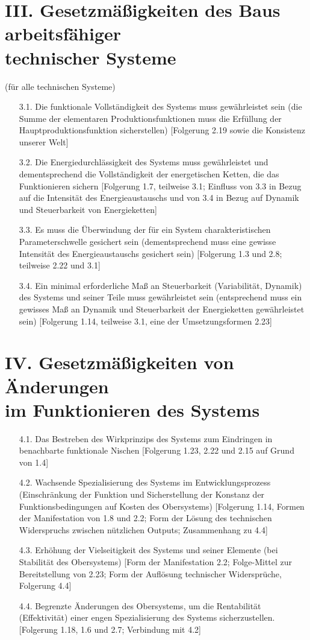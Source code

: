 \documentclass[11pt,a4paper]{article}
\begin{document}
\section*{III. Gesetzmäßigkeiten des Baus arbeitsfähiger\\ technischer
  Systeme}  
(für alle technischen Systeme)
\begin{itemize}
\item[3.1.] Die funktionale Vollständigkeit des Systems muss gewährleistet
  sein (die Summe der elementaren Produktionsfunktionen muss die Erfüllung der
  Hauptproduktionsfunktion sicherstellen) [Folgerung 2.19 sowie die Konsistenz
    unserer Welt]
\item[3.2.] Die Energiedurchlässigkeit des Systems muss gewährleistet und
  dementsprechend die Vollständigkeit der energetischen Ketten, die das
  Funktionieren sichern [Folgerung 1.7, teilweise 3.1; Einfluss von 3.3 in
    Bezug auf die Intensität des Energieaustauschs und von 3.4 in Bezug auf
    Dynamik und Steuerbarkeit von Energieketten]
\item[3.3.] Es muss die Überwindung der für ein System charakteristischen
  Parameterschwelle gesichert sein (dementsprechend muss eine gewisse
  Intensität des Energieaustauschs gesichert sein) [Folgerung 1.3 und 2.8;
    teilweise 2.22 und 3.1]
\item[3.4.] Ein minimal erforderliche Maß an Steuerbarkeit (Variabilität,
  Dynamik) des Systems und seiner Teile muss gewährleistet sein (entsprechend
  muss ein gewisses Maß an Dynamik und Steuerbarkeit der Energieketten
  gewährleistet sein) [Folgerung 1.14, teilweise 3.1, eine der
    Umsetzungsformen 2.23]
\end{itemize}
\section*{IV. Gesetzmäßigkeiten von Änderungen\\ im Funktionieren des Systems}
\begin{itemize}
\item[4.1.] Das Bestreben des Wirkprinzips des Systems zum Eindringen in
  benachbarte funktionale Nischen [Folgerung 1.23, 2.22 und 2.15 auf Grund von
    1.4]
\item[4.2.] Wachsende Spezialisierung des Systems im Entwicklungsprozess
  (Einschränkung der Funktion und Sicherstellung der Konstanz der
  Funktionsbedingungen auf Kosten des Obersystems) [Folgerung 1.14, Formen der
    Manifestation von 1.8 und 2.2; Form der Lösung des technischen
    Widerspruchs zwischen nützlichen Outputs; Zusammenhang zu 4.4]
\item[4.3.] Erhöhung der Vielseitigkeit des Systems und seiner Elemente (bei
  Stabilität des Obersystems) [Form der Manifestation 2.2; Folge-Mittel zur
    Bereitstellung von 2.23; Form der Auf\-lösung technischer Widersprüche,
    Folgerung 4.4]
\item[4.4.] Begrenzte Änderungen des Obersystems, um die Rentabilität
  (Effektivität) einer engen Spezialisierung des Systems sicherzustellen.
  [Folgerung 1.18, 1.6 und 2.7; Verbindung mit 4.2]
\end{itemize}
\end{document}
